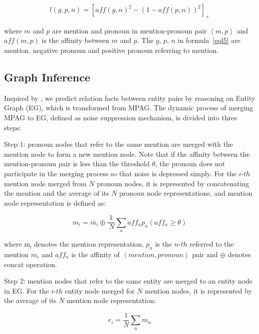 \documentclass{article}
\begin{document}
\begin{equation}
{l}(g,p,n)=\left[aff(g, n)^{2}-(1-aff(p, n))^{2}\right]_{+}
\label{eql5}
\end{equation}

where $m$ and $p$ are mention and pronoun in mention-pronoun pair $\left<m, p\right>$ and $aff\left(m,p \right)$ is the affinity between $m$ and $p$. The $g$, $p$, $n$ in formula~\ref{eql5} are mention, negative pronoun and positive pronoun referring to mention.

\subsection{Graph Inference}

Inspired by \cite{zeng2020double}, we predict relation facts between entity pairs by reasoning on Entity Graph (EG), which is transformed from MPAG. The dynamic process of merging MPAG to EG, defined as noise suppression mechanism, is divided into three steps: 

Step 1: pronoun nodes that refer to the same mention are merged with the mention node to form a new mention node. Note that if the affinity between the mention-pronoun pair is less than the threshold $\theta$, the pronoun does not participate in the merging process so that noise is depressed simply. For the 
$i$-$th$ mention node merged from $N$ pronoun nodes, it is represented by concatenating the mention and the average of its $N$ pronoun node representations, and mention node representation is defined as:

\begin{equation}
{m}_{i}=\bar{m_{i}} \oplus  \frac{1}{~N} \sum_{n} aff_{n} p_{n}\left({aff}_{n} \geq \theta\right)
\label{eql6}
\end{equation}

where $\bar{\mathrm{m}_{\mathrm{i}}}$ denotes the mention representation, $p_{n}$ is the $n$-$th$ referred to the mention $m_{i}$ and $aff_{n}$ is the affinity of $\left< mention,pronoun \right>$ pair and $\oplus$ denotes concat operation.

Step 2: mention nodes that refer to the same entity are merged to an entity node in EG. For the $i$-$th$ entity node merged for $N$ mention nodes, it is represented by the average of its $N$ mention node representation:

\begin{equation}
e_{i}=\frac{1}{N} \sum_{n} m_{n}
\label{eql7}
\end{equation}
\end{document}
